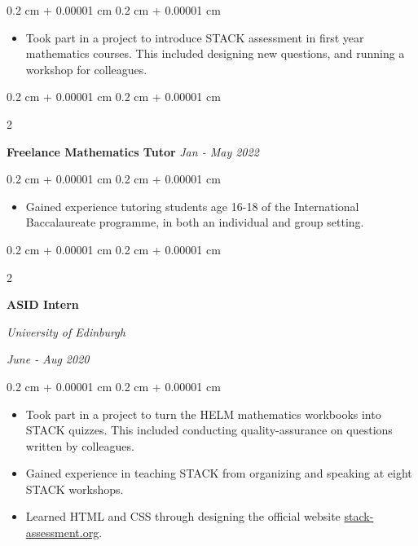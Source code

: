 \documentclass[10pt, letterpaper]{article}
\newenvironment{highlights}{
    \begin{itemize}[
        topsep=0.10 cm,
        parsep=0.10 cm,
        partopsep=0pt,
        itemsep=0pt,
        leftmargin=0.4 cm + 10pt
    ]
}{
    \end{itemize}
} %
\newenvironment{onecolentry}{
    \begin{adjustwidth}{
        0.2 cm + 0.00001 cm
    }{
        0.2 cm + 0.00001 cm
    }
}{
    \end{adjustwidth}
} %
\newenvironment{twocolentry}[2][]{
    \onecolentry
    \def\secondColumn{#2}
    \setcolumnwidth{\fill, 4.5 cm}
    \begin{paracol}{2}
}{
    \switchcolumn \raggedleft \secondColumn
    \end{paracol}
    \endonecolentry
} %
\let\hrefWithoutArrow\href
\renewcommand{\href}[2]{\hrefWithoutArrow{#1}{\ifthenelse{\equal{#2}{}}{ }{#2 }\raisebox{.15ex}{\footnotesize \faExternalLink*}}}
\begin{document}
        \vspace{0.10 cm}
        \begin{onecolentry}
            \begin{highlights}
                \item Took part in a project to introduce STACK assessment in first year mathematics courses. This included designing new questions, and running a workshop for colleagues.
            \end{highlights}
        \end{onecolentry}


        \vspace{0.2 cm}

        \begin{twocolentry}{
        \textit{Jan - May 2022}}
            \textbf{Freelance Mathematics Tutor}        \end{twocolentry}

        \vspace{0.10 cm}
        \begin{onecolentry}
            \begin{highlights}
                \item Gained experience tutoring students age 16-18 of the International Baccalaureate programme, in both an individual and group setting.
            \end{highlights}
        \end{onecolentry}


        \vspace{0.2 cm}

        \begin{twocolentry}{
        \textit{June - Aug 2020}}
            \textbf{ASID Intern}
            
            \textit{University of Edinburgh}
        \end{twocolentry}

        \vspace{0.10 cm}
        \begin{onecolentry}
            \begin{highlights}
                \item Took part in a project to turn the HELM mathematics workbooks into STACK quizzes. This included conducting quality-assurance on questions written by colleagues.
                \item Gained experience in teaching STACK from organizing and speaking at eight STACK workshops.
                \item Learned HTML and CSS through designing the official website \hrefWithoutArrow{https://stack-assessment.org/}{stack-assessment.org}. 
            \end{highlights}
        \end{onecolentry}
\end{document}
